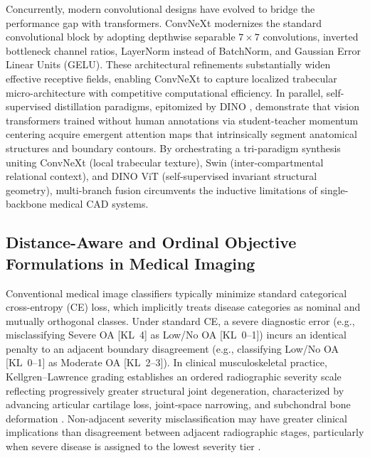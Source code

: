 \documentclass[10pt,journal]{IEEEtran}
\begin{document}
Concurrently, modern convolutional designs have evolved to bridge the performance gap with transformers. ConvNeXt \cite{liu2022convnext} modernizes the standard convolutional block by adopting depthwise separable $7 \times 7$ convolutions, inverted bottleneck channel ratios, LayerNorm instead of BatchNorm, and Gaussian Error Linear Units (GELU). These architectural refinements substantially widen effective receptive fields, enabling ConvNeXt to capture localized trabecular micro-architecture with competitive computational efficiency. In parallel, self-supervised distillation paradigms, epitomized by DINO \cite{caron2021dino}, demonstrate that vision transformers trained without human annotations via student-teacher momentum centering acquire emergent attention maps that intrinsically segment anatomical structures and boundary contours. By orchestrating a tri-paradigm synthesis uniting ConvNeXt (local trabecular texture), Swin (inter-compartmental relational context), and DINO ViT (self-supervised invariant structural geometry), multi-branch fusion circumvents the inductive limitations of single-backbone medical CAD systems.

\subsection{Distance-Aware and Ordinal Objective Formulations in Medical Imaging}
\label{subsec:ordinal_formulations}

Conventional medical image classifiers typically minimize standard categorical cross-entropy (CE) loss, which implicitly treats disease categories as nominal and mutually orthogonal classes. Under standard CE, a severe diagnostic error (e.g., misclassifying Severe OA [KL~4] as Low/No OA [KL~0--1]) incurs an identical penalty to an adjacent boundary disagreement (e.g., classifying Low/No OA [KL~0--1] as Moderate OA [KL~2--3]). In clinical musculoskeletal practice, Kellgren--Lawrence grading establishes an ordered radiographic severity scale reflecting progressively greater structural joint degeneration, characterized by advancing articular cartilage loss, joint-space narrowing, and subchondral bone deformation \cite{kellgren1957radiological, emrani2008joint}. Non-adjacent severity misclassification may have greater clinical implications than disagreement between adjacent radiographic stages, particularly when severe disease is assigned to the lowest severity tier \cite{zhang2010eular}.
\end{document}
